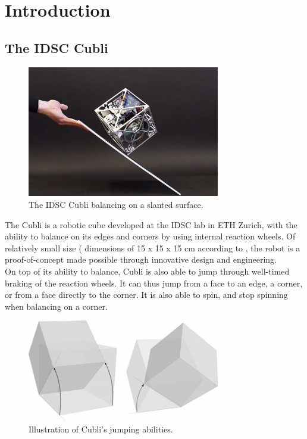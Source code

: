 \chapter{Introduction}\label{sec:introduction}

\section{The IDSC Cubli}\label{sec:cubli}

\begin{figure}[ht]
   \centering
   \includegraphics[width=0.75\textwidth]{img/Cubli.jpg}
   \caption{The IDSC Cubli balancing on a slanted surface.}
   \label{img:Cubli}
\end{figure}

The Cubli is a robotic cube developed at the IDSC lab in ETH Zurich, with the ability to balance on its edges and corners by using internal reaction wheels. Of relatively small size ( dimensions of 15 x 15 x 15 cm according to \cite{cubliECC13}, the robot is a proof-of-concept made possible through innovative design and engineering.\\

On top of its ability to balance, Cubli is also able to jump through well-timed braking of the reaction wheels. It can thus jump from a face to an edge, a corner, or from a face directly to the corner. It is also able to spin, and stop spinning when balancing on a corner.

\begin{figure}[ht]
   \centering
   \includegraphics[width=0.75\textwidth]{img/Jumps.png}
   \caption{Illustration of Cubli's jumping abilities.}
   \label{img:Jumps}
\end{figure}

